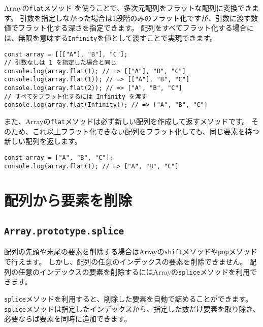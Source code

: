 Arrayの\texttt{flat}メソッド\,\protect{}\,を使うことで、多次元配列をフラットな配列に変換できます。
引数を指定しなかった場合は1段階のみのフラット化ですが、引数に渡す数値でフラット化する深さを指定できます。
配列をすべてフラット化する場合には、無限を意味する\texttt{Infinity}を値として渡すことで実現できます。

\begin{lstlisting}
const array = [[["A"], "B"], "C"];
// 引数なしは 1 を指定した場合と同じ
console.log(array.flat()); // => [["A"], "B", "C"]
console.log(array.flat(1)); // => [["A"], "B", "C"]
console.log(array.flat(2)); // => ["A", "B", "C"]
// すべてをフラット化するには Infinity を渡す
console.log(array.flat(Infinity)); // => ["A", "B", "C"]
\end{lstlisting}

また、Arrayの\texttt{flat}メソッドは必ず新しい配列を作成して返すメソッドです。
そのため、これ以上フラット化できない配列をフラット化しても、同じ要素を持つ新しい配列を返します。

\begin{lstlisting}
const array = ["A", "B", "C"];
console.log(array.flat()); // => ["A", "B", "C"]
\end{lstlisting}

\hypertarget{delete-element}{%
\section{配列から要素を削除}\label{delete-element}}

\hypertarget{splice}{%
\subsection{\texorpdfstring{\texttt{Array.prototype.splice}}{Array.prototype.splice}}\label{splice}}

配列の先頭や末尾の要素を削除する場合はArrayの\texttt{shift}メソッドや\texttt{pop}メソッドで行えます。
しかし、配列の任意のインデックスの要素を削除できません。
配列の任意のインデックスの要素を削除するにはArrayの\texttt{splice}メソッドを利用できます。

\texttt{splice}メソッドを利用すると、削除した要素を自動で詰めることができます。
\texttt{splice}メソッドは指定したインデックスから、指定した数だけ要素を取り除き、必要ならば要素を同時に追加できます。

